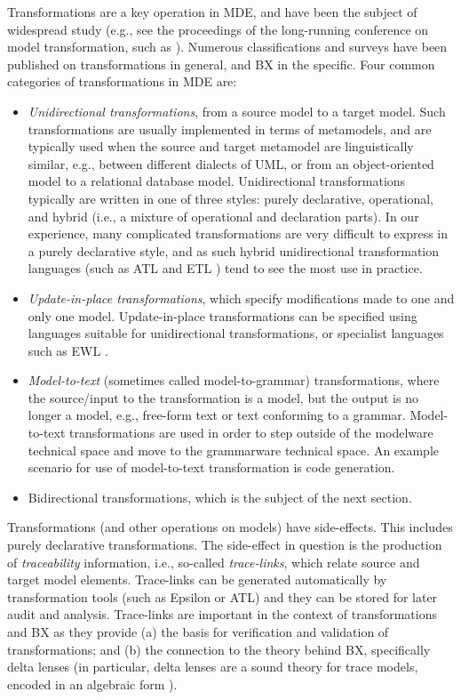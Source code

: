 Transformations are a key operation in MDE, and have been the subject of widespread study (e.g., see the proceedings of the long-running conference on model transformation, such as \cite{icmt2016} ). Numerous classifications and surveys have been published on transformations in general, and BX in the specific. Four common categories of transformations in MDE are:
\begin{itemize}
\item \textit{Unidirectional transformations}, from a source model to a target model. Such transformations are usually implemented in terms of metamodels, and are typically used when the source and target metamodel are linguistically similar, e.g., between different dialects of UML, or from an object-oriented model to a relational database model. Unidirectional transformations typically are written in one of three styles: purely declarative, operational, and hybrid (i.e., a mixture of operational and declaration parts). In our experience, many complicated transformations are very difficult to express in a purely declarative style, and as such hybrid unidirectional transformation languages (such as ATL \cite{JouaultABK08} and ETL \cite{Kolovos2008}) tend to see the most use in practice.

\item \textit{Update-in-place transformations}, which specify modifications made to one and only one model. Update-in-place transformations can be specified using languages suitable for unidirectional transformations, or specialist languages such as EWL \cite{KolovosPPR07}.

\item \textit{Model-to-text} (sometimes called model-to-grammar) transformations, where the source/input to the transformation is a model, but the output is no longer a model, e.g., free-form text or text conforming to a grammar. Model-to-text transformations are used in order to step outside of the modelware technical space and move to the grammarware technical space. An example scenario for use of model-to-text transformation is code generation.

\item Bidirectional transformations, which is the subject of the next section.
\end{itemize}
Transformations (and other operations on models) have side-effects. This includes purely declarative transformations. The side-effect in question is the production of \textit{traceability} information, i.e., so-called \textit{trace-links}, which relate source and target model elements. Trace-links can be generated automatically by transformation tools (such as Epsilon or ATL) and they can be stored for later audit and analysis. Trace-links are important in the context of transformations and BX as they provide (a) the basis for verification and validation of transformations; and (b) the connection to the theory behind BX, specifically delta lenses (in particular, delta lenses are a sound theory for trace models, encoded in an algebraic form \cite{DiskinXC10}).

